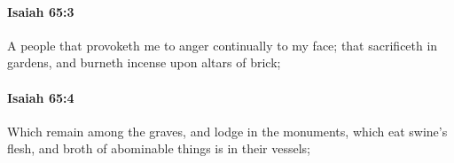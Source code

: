 		\paragraph{Isaiah 65:3} %
			\label{ISAIAH-65-3}

			A people that provoketh me to anger continually to my face; that sacrificeth in gardens, and burneth incense upon altars of brick;


		\paragraph{Isaiah 65:4} %
			\label{ISAIAH-65-4}

			Which remain among the graves, and lodge in the monuments, which eat swine's flesh, and broth of abominable things is in their vessels;


